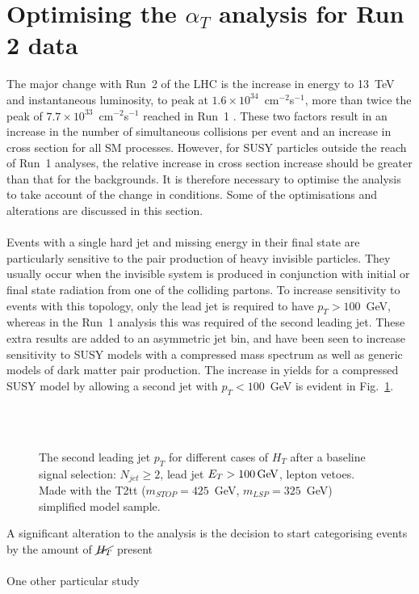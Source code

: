
\section{Optimising the $\alpha_T$ analysis for Run 2 data}
\label{sec:analysisOptimisation}

The major change with Run~2 of the LHC is the increase in energy to 13~TeV and instantaneous luminosity, to peak at $1.6\times10^{34}$~cm$^{-2}$s$^{-1}$, more than twice the peak of $7.7\times10^{33}$~cm$^{-2}$s$^{-1}$ reached in Run~1 \cite{LHCLuminosityIPAC13}. These two factors result in an increase in the number of simultaneous collisions per event and an increase in cross section for all SM processes. However, for SUSY particles outside the reach of Run~1 analyses, the relative increase in cross section increase should be greater than that for the backgrounds. It is therefore necessary to optimise the analysis to take account of the change in conditions. Some of the optimisations and alterations are discussed in this section.
\\\\
Events with a single hard jet and missing energy in their final state are particularly sensitive to the pair production of heavy invisible particles. They usually occur when the invisible system is produced in conjunction with initial or final state radiation from one of the colliding partons. To increase sensitivity to events with this topology, only the lead jet is required to have $p_T>100$~GeV, whereas in the Run~1 analysis this was required of the second leading jet. These extra results are added to an asymmetric jet bin, and have been seen to increase sensitivity to SUSY models with a compressed mass spectrum as well as generic models of dark matter pair production. The increase in yields for a compressed SUSY model by allowing a second jet with $p_T<100$~GeV is evident in Fig.~\ref{fig:asymMotivation}.
\\\\
\begin{figure}[h!]
  \centering
  ~~
  \\
  \caption{\label{fig:asymMotivation} The second leading jet $p_T$ for different
  cases of $H_T$ after a baseline signal selection: $N_{jet}\geq2$, lead jet
  $E_T>100\mathrm{\,Ge\kern -0.1em V}$, lepton vetoes. Made with the T2tt ($m_{STOP}=425$~GeV, $m_{LSP}=325$~GeV) simplified model sample.}
\end{figure}

A significant alteration to the analysis is the decision to start categorising events by the amount of $\cancel{H_T}$ present
\\\\
One other particular study 